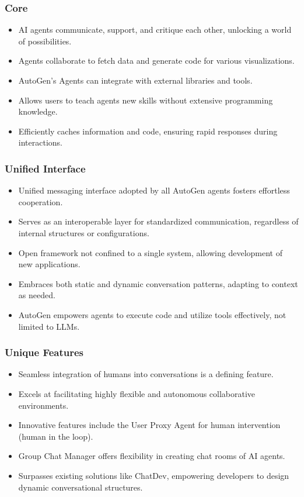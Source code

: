 \begin{frame}[fragile]\frametitle{Core}
  \begin{itemize}
    \item AI agents communicate, support, and critique each other, unlocking a world of possibilities.
    \item Agents collaborate to fetch data and generate code for various visualizations.
    \item AutoGen’s Agents can integrate with external libraries and tools.
    \item Allows users to teach agents new skills without extensive programming knowledge.
    \item Efficiently caches information and code, ensuring rapid responses during interactions.
  \end{itemize}
\end{frame}


\begin{frame}[fragile]\frametitle{Unified Interface}
  \begin{itemize}
    \item Unified messaging interface adopted by all AutoGen agents fosters effortless cooperation.
    \item Serves as an interoperable layer for standardized communication, regardless of internal structures or configurations.
    \item Open framework not confined to a single system, allowing development of new applications.
    \item Embraces both static and dynamic conversation patterns, adapting to context as needed.
    \item AutoGen empowers agents to execute code and utilize tools effectively, not limited to LLMs.
  \end{itemize}
\end{frame}

\begin{frame}[fragile]\frametitle{Unique Features}
  \begin{itemize}
    \item Seamless integration of humans into conversations is a defining feature.
    \item Excels at facilitating highly flexible and autonomous collaborative environments.
    \item Innovative features include the User Proxy Agent for human intervention (human in the loop).
    \item Group Chat Manager offers flexibility in creating chat rooms of AI agents.
    \item Surpasses existing solutions like ChatDev, empowering developers to design dynamic conversational structures.
  \end{itemize}
\end{frame}

